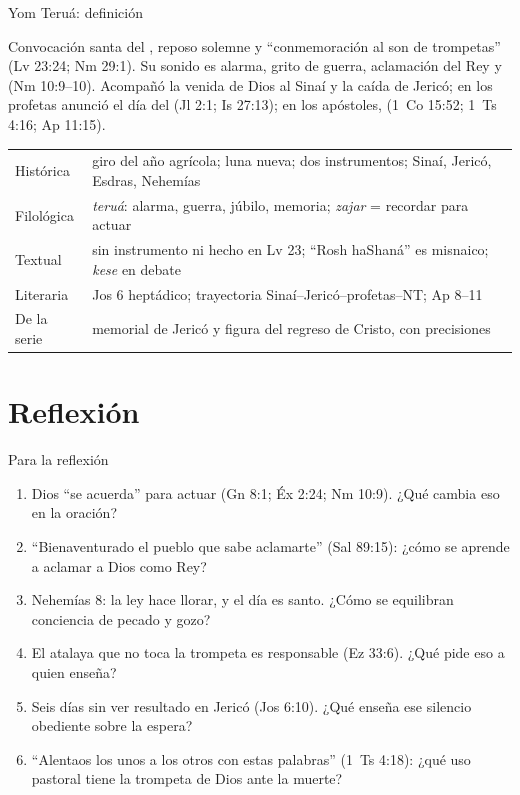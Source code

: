 \begin{frame}{Yom Teruá: definición}
\begin{tcolorbox}[colback=papiro,colframe=tierraroja,boxrule=1pt,arc=3pt,fontupper=\small]
\RaggedRight Convocación santa del , reposo solemne y ``conmemoración al son de trompetas'' (Lv 23:24; Nm 29:1). Su sonido es alarma, grito de guerra, aclamación del Rey y  (Nm 10:9--10). Acompañó la venida de Dios al Sinaí y la caída de Jericó; en los profetas anunció el día del \SENOR{} (Jl 2:1; Is 27:13); en los apóstoles,  (1~Co 15:52; 1~Ts 4:16; Ap 11:15).
\end{tcolorbox}
\scriptsize\renewcommand{\arraystretch}{1.08}
\begin{tabular}{@{}L{2.2cm}L{9.4cm}@{}}
\toprule
Histórica & giro del año agrícola; luna nueva; dos instrumentos; Sinaí, Jericó, Esdras, Nehemías \\
Filológica & \emph{teruá}: alarma, guerra, júbilo, memoria; \emph{zajar} = recordar para actuar \\
Textual & sin instrumento ni hecho en Lv 23; ``Rosh haShaná'' es misnaico; \emph{kese} en debate \\
Literaria & Jos 6 heptádico; trayectoria Sinaí--Jericó--profetas--NT; Ap 8--11 \\
De la serie & memorial de Jericó y figura del regreso de Cristo, con precisiones \\
\bottomrule
\end{tabular}
\end{frame}

\section{Reflexión}

\begin{frame}{Para la reflexión}
\small\RaggedRight
\begin{enumerate}
\item Dios ``se acuerda'' para actuar (Gn 8:1; Éx 2:24; Nm 10:9). ¿Qué cambia eso en la oración?
\item ``Bienaventurado el pueblo que sabe aclamarte'' (Sal 89:15): ¿cómo se aprende a aclamar a Dios como Rey?
\item Nehemías 8: la ley hace llorar, y el día es santo. ¿Cómo se equilibran conciencia de pecado y gozo?
\item El atalaya que no toca la trompeta es responsable (Ez 33:6). ¿Qué pide eso a quien enseña?
\item Seis días sin ver resultado en Jericó (Jos 6:10). ¿Qué enseña ese silencio obediente sobre la espera?
\item ``Alentaos los unos a los otros con estas palabras'' (1~Ts 4:18): ¿qué uso pastoral tiene la trompeta de Dios ante la muerte?
\end{enumerate}
\end{frame}

